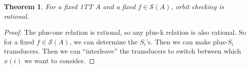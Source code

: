 \documentclass[11pt]{book}
\theoremstyle{pleasant}
\newtheorem{theorem}{Theorem}
\newcommand{\0}{\underline{0}}
\newcommand{\1}{\underline{1}}
\newcommand{\2}{\underline{2}}
\newcommand{\N}{\mathbb{N}}
\renewcommand{\S}{\mathcal{S}}
\begin{document}
\begin{theorem}
For a fixed 1TT $A$ and a fixed $f \in \S(A)$, orbit checking is rational.
\end{theorem}
\begin{proof}
The plus-one relation is rational, so any plus-k relation is also rational. So for a fixed $f \in \S(A)$, we can determine the $S_i$'s. Then we can make plus-$S_i$ transducers. Then we can ``interleave'' the transducers to switch between which $x(i)$ we want to consider.
\end{proof}





\end{document}
